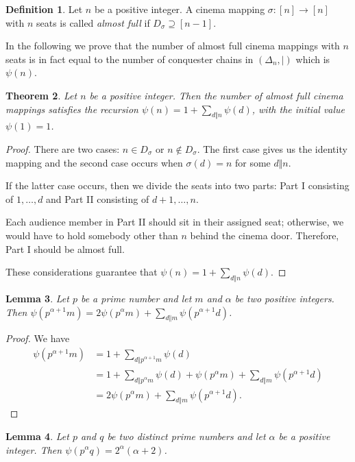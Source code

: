 \documentclass{amsart}
\newtheorem{theorem}{Theorem}[section]
\newtheorem{lemma}[theorem]{Lemma}
\theoremstyle{definition}
\newtheorem{definition}[theorem]{Definition}
\begin{document}
\begin{definition}
Let $n$ be a positive integer. A cinema mapping $\sigma:[n]\to[n]$ with $n$ seats is called \textit{almost full} if $D_\sigma\supseteq[n-1]$. 
\end{definition}
In the following we prove that the number of almost full cinema mappings with $n$ seats is in fact equal to the number of conquester chains in $(\Delta_n,|)$ which is $\psi(n)$. 
\begin{theorem}
Let $n$ be a positive integer. Then the number of almost full cinema mappings satisfies the recursion $\psi(n)=1+\sum_{d\Vert n}\psi(d)$, with the initial value $\psi(1)=1$. 
\end{theorem}

\begin{proof}
There are two cases: $n\in D_\sigma$ or $n\notin D_\sigma$. The first case gives us the identity mapping and the second case occurs when $\sigma(d)=n$ for some $d\Vert n$. 

If the latter case occurs, then we divide the seats into two parts: Part I consisting of $1,\ldots,d$ and Part II consisting of $d+1,\ldots,n$.

Each audience member in Part II should sit in their assigned seat; otherwise, we would have to hold somebody other than $n$ behind the cinema door. Therefore, Part I should be almost full.

These considerations guarantee that $\psi(n)=1+\sum_{d\Vert n}\psi(d)$.
\end{proof}

\begin{lemma}\label{recurpsi}
Let $p$ be a prime number and let $m$ and $\alpha$ be two positive integers. Then $\psi(p^{\alpha+1} m)=2\psi(p^{\alpha} m)+\sum_{d\Vert m}\psi(p^{\alpha+1} d)$.
\end{lemma}

\begin{proof}
We have
\begin{align*}
\psi(p^{\alpha+1} m)&=1+\sum_{d\Vert p^{\alpha+1} m}\psi(d)\\
&=1+\sum_{d\Vert p^{\alpha} m}\psi(d)+ \psi(p^{\alpha} m) +\sum_{d\Vert m}\psi(p^{\alpha+1} d)\\
&=2\psi(p^{\alpha} m)+\sum_{d\Vert m}\psi(p^{\alpha+1} d).
\end{align*}

\end{proof}

\begin{lemma}\label{q1}
Let $p$ and $q$ be two distinct prime numbers and let $\alpha$ be a positive integer. Then $\psi(p^\alpha q)=2^\alpha(\alpha+2)$.
\end{lemma}
\end{document}
